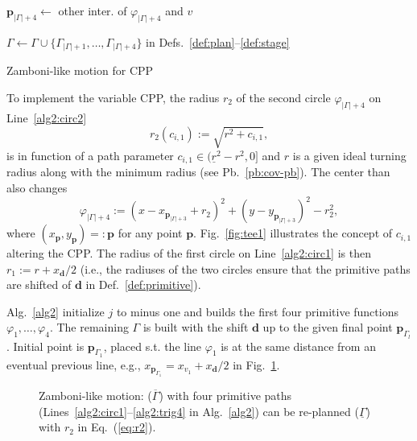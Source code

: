 \documentclass[letterpaper,10pt,journal,twoside]{IEEEtran}
\newcommand{\figpath}{./figures}
\theoremstyle{definition}
\begin{document}
\begin{algorithm}[t]
\begin{algorithmic}[1]
          \STATE $\mathbf{p}_{|\Gamma|+4}\gets$ other inter. %
          of $\varphi_{|\Gamma|+4}$ and $v$\vspace*{.3ex}\label{alg2:trig4}

          \vspace*{.8ex}
          \STATE $\Gamma\gets\Gamma\cup\{\Gamma_{|\Gamma|+1},\dots,\Gamma_{|\Gamma|+4}\}${ in Defs.~\ref{def:plan}--\ref{def:stage}}\label{alg2:last}

        \ENDIF
      \ENDIF
    \ENDFOR
  \end{algorithmic}
  \caption{Zamboni-like motion for CPP}\label{alg2}
\end{algorithm}

To implement the variable CPP, the radius $r_2$ of the second circle $\varphi_{|\Gamma|+4}$ on Line~\ref{alg2:circ2}
\begin{equation}\label{eq:r2}
  r_2(c_{i,1}):=\sqrt{r^2+c_{i,1}},
\end{equation}
is in function of a path parameter $c_{i,1}\in(\underline{r}^2-r^2,0]$ and $r$ is a given ideal turning radius along with the minimum radius (see Pb.~\ref{pb:cov-pb}). The center than also changes
\begin{equation}\label{eq:second-circ-gene}
  \varphi_{|\Gamma|+4}:=(x-x_{\mathbf{p}_{|\Gamma|+3}}+r_2)^2+(y-y_{\mathbf{p}_{|\Gamma|+3}})^2-r_2^2,
\end{equation}
where $(x_\mathbf{p},y_\mathbf{p})=:\mathbf{p}$ for any point $\mathbf{p}$. Fig.~\ref{fig:tee1} illustrates the concept of $c_{i,1}$ altering the CPP. The radius of the first circle on Line~\ref{alg2:circ1} is then $r_1:=r+x_\mathbf{d}/2$ (i.e., the radiuses of the two circles ensure that the primitive paths are shifted of $\mathbf{d}$ in Def.~\ref{def:primitive}).

Alg.~\ref{alg2} initialize $j$ to minus one and builds the first four primitive functions $\varphi_1,\dots,\varphi_4$. The remaining $\Gamma$ is built with the shift $\mathbf{d}$ up to the given final point $\mathbf{p}_{\Gamma_l}$. Initial point is $\mathbf{p}_{\Gamma_1}$, placed s.t. the line $\varphi_1$ is at the same distance from an eventual previous line, e.g., $x_{\mathbf{p}_{\Gamma_1}}=x_{v_1}+x_{\mathbf{d}}/2$ in Fig.~\ref{fig:zambo}.

\begin{figure}[t]
  \footnotesize
  \begin{minipage}[l]{0.73\columnwidth}
    \centering
    \vspace*{-2ex}
    
  \end{minipage}\hfill
  \begin{minipage}[l]{0.25\columnwidth}
    \caption{Zamboni-like motion: ($\overline{\Gamma}$) with four primitive paths (Lines~\ref{alg2:circ1}--\ref{alg2:trig4} in Alg.~\ref{alg2}) can be re-planned ($\underline{\Gamma}$) with $r_2$ in Eq.~(\ref{eq:r2}).}
    \label{fig:zambo}
  \end{minipage}
  \vspace*{-4.5ex}
\end{figure}
\end{document}
